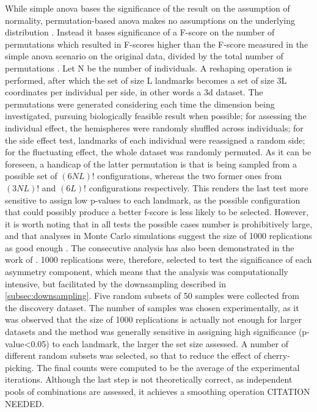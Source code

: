 While simple \ac{anova} bases the significance of the result on the assumption of normality, permutation-based \ac{anova} makes no assumptions on the underlying distribution \cite{Anderson2001}. Instead it bases significance of a F-score on the number of permutations which resulted in F-scores higher than the F-score measured in the simple \ac{anova} scenario on the original data, divided by the total number of permutations \cite{Klingenberg1998}. Let N be the number of individuals. A reshaping operation is performed, after which the set of size L landmarks becomes a set of size 3L coordinates per individual per side, in other words a \ac{3d} dataset. The permutations were generated considering each time the dimension being investigated, pursuing biologically feasible result when possible; for assessing the individual effect, the hemispheres were randomly shuffled across individuals; for the side effect test, landmarks of each individual were reassigned a random side; for the fluctuating effect, the whole dataset was randomly permuted. As it can be foreseen, a handicap of the latter permutation is that is being sampled from a possible set of $(6NL)!$ configurations, whereas the two former ones from $(3NL)!$ and $(6L)!$ configurations respectively. This renders the last test more sensitive to assign low p-values to each landmark, as the possible configuration that could possibly produce a better f-score is less likely to be selected. However, it is worth noting that in all tests the possible cases number is prohibitively large, and that analyses in Monte Carlo simulations suggest the size of 1000 replications as good enough \cite{Marozzi2004}. The consecutive analysis has also been demonstrated in the work of \citet{Vanbiervliet2022}. 1000 replications were, therefore, selected to test the significance of each asymmetry component, which means that the analysis was computationally intensive, but facilitated by the downsampling described in \autoref{subsec:downsampling}. Five random subsets of 50 samples were collected from the discovery dataset. The number of samples was chosen experimentally, as it was observed that the size of 1000 replications is actually not enough for larger datasets and the method was generally sensitive in assigning high significance (p-value<0.05) to each landmark, the larger the set size assessed. A number of different random subsets was selected, so that to reduce the effect of cherry-picking. The final counts were computed to be the average of the experimental iterations. Although the last step is not theoretically correct, as independent pools of combinations are assessed, it achieves a smoothing operation CITATION NEEDED.

